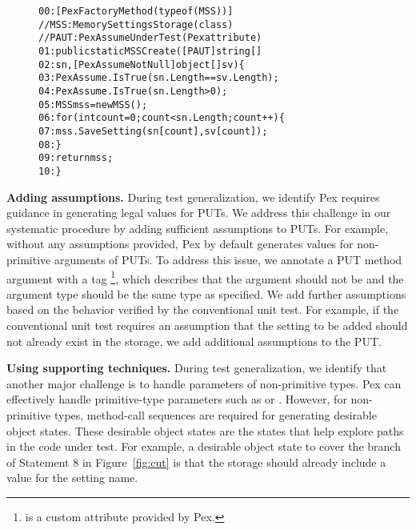 \begin{figure}[t]
\begin{CodeOut}
\begin{alltt}
00:[PexFactoryMethod(typeof(MSS))]
\hspace*{0.3in}//MSS: MemorySettingsStorage (class)
\hspace*{0.3in}//PAUT: PexAssumeUnderTest	(Pex attribute)
01:public static MSS Create([PAUT]string[] 
02:\hspace*{0.3in}sn, [PexAssumeNotNull]object[] sv) \{
03:\hspace*{0.2in}PexAssume.IsTrue(sn.Length == sv.Length);
04:\hspace*{0.2in}PexAssume.IsTrue(sn.Length > 0);
05:\hspace*{0.2in}MSS mss = new MSS();
06:\hspace*{0.2in}for (int count = 0; count < sn.Length; count++) \{
07:\hspace*{0.3in}mss.SaveSetting(sn[count], sv[count]);
08:\hspace*{0.2in}\}
09:\hspace*{0.2in}return mss;            
10:\}
\end{alltt}
\end{CodeOut}
\end{figure}

\textbf{Adding assumptions.} During test generalization, we identify Pex requires guidance in generating legal values for PUTs. We address this challenge in our systematic procedure by adding sufficient assumptions to PUTs. For example, without any assumptions provided, Pex by default generates  values for non-primitive arguments of PUTs. To address this issue, we annotate a PUT method argument with a tag \footnote{ is a custom attribute provided by Pex.}, which describes that the argument should not be  and the argument type should be the same type as specified. We add further assumptions based on the behavior verified by the conventional unit test. For example, if the conventional unit test requires an assumption that the setting to be added should not already exist in the storage, we add additional assumptions to the PUT.

\textbf{Using supporting techniques.} During test generalization, we identify that another major challenge is to handle parameters of non-primitive types. Pex can effectively handle primitive-type parameters such as  or . However, for non-primitive types, method-call sequences are required for generating desirable object states. These desirable object states are the states that help explore paths in the code under test. For example, a desirable object state to cover the  branch of Statement 8 in Figure~\ref{fig:cut} is that the storage should already include a value for the setting name. 

